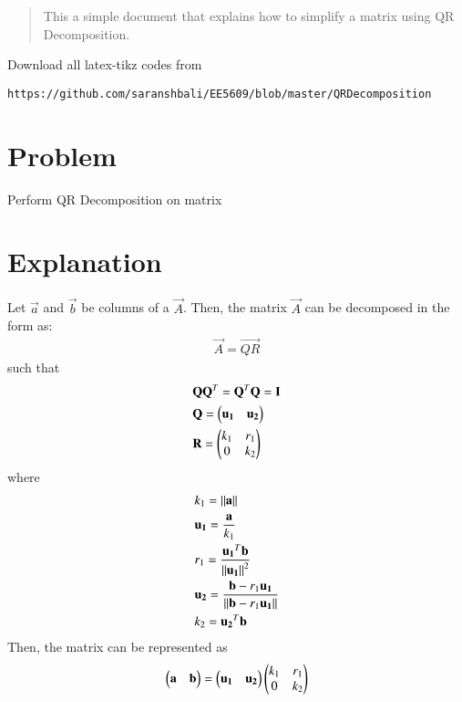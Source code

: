 \documentclass[journal,12pt,twocolumn]{IEEEtran}
\begin{document}
%
\begin{abstract}
This a simple document that explains how to simplify a matrix using QR Decomposition.
\end{abstract}
%
%
Download all latex-tikz codes from 
%
\begin{lstlisting}
https://github.com/saranshbali/EE5609/blob/master/QRDecomposition
\end{lstlisting}
%
\section{Problem}
Perform QR Decomposition on matrix  
\section{Explanation}
Let $\vec{a}$ and $\vec{b}$ be columns of a $\vec{A}$. Then, the matrix $\vec{A}$ can be decomposed in the form as:
\begin{align}
 \vec{A} = \vec{QR} 
\end{align}
such that  
\begin{align}
	& \mathbf{Q}\mathbf{Q}^T= \mathbf{Q}^T\mathbf{Q} = \mathbf{I} \\ 
	& \mathbf{Q} = \begin{pmatrix}\mathbf{u_1} & \mathbf{u_2}\end{pmatrix}  \\
	& \mathbf{R} = \begin{pmatrix}k_1 & r_1 \\ 0 & k_2\end{pmatrix} 
\end{align}
where
\begin{align}
& k_1 = \left\lVert\mathbf{a}\right\rVert \label{1} \\
& \mathbf{u_1} = \frac{\mathbf{a}}{k_1} \label{2} \\
& r_1 = \frac{\mathbf{u_1}^T\mathbf{b}}{\left\lVert\mathbf{u_1}\right\rVert^2} \label{3} \\
& \mathbf{u_2} = \frac{\mathbf{b}-r_1\mathbf{u_1}}{\left\lVert\mathbf{b}-r_1\mathbf{u_1}\right\rVert} \label{4} \\
& k_2 = \mathbf{u_2}^T\mathbf{b} \label{5}
\end{align}
Then, the matrix can be represented as 
\begin{align}
	\begin{pmatrix}\mathbf{a} & \mathbf{b} \end{pmatrix} = \begin{pmatrix}\mathbf{u_1} & \mathbf{u_2}\end{pmatrix}\begin{pmatrix}k_1 & r_1 \\ 0 & k_2\end{pmatrix} \label{6}
\end{align}
\end{document}

